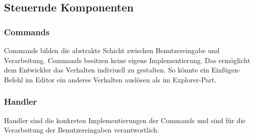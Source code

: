 \FloatBarrier
\subsection{Steuernde Komponenten}
\subsubsection{Commands}
Commands bilden die abstrakte Schicht zwischen Benutzereingabe und Verarbeitung. Commands besitzen keine eigene Implementierung. Das ermöglicht dem Entwickler das Verhalten indiviuell zu gestalten. So könnte ein Einfügen-Befehl im Editor ein anderes Verhalten auslösen als im Explorer-Part\cite[org.eclipse.ui.commands]{eclipse:help}.

\subsubsection{Handler}
Handler sind die konkreten Implementierungen der Commands und sind für die Verarbeitung der Benutzereingaben verantwortlich.

